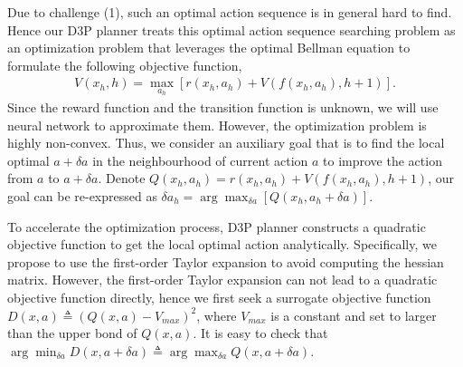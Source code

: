 \documentclass{article} %
\newcommand{\vmax}{V_{max}}
\newcommand{\lijun}[1]{ {#1}}
\newcommand{\yue}[1]{ {#1}}
\begin{document}
Due to challenge (1), such an optimal action sequence is in general hard to find. Hence our D3P planner treats this optimal action sequence searching problem as an optimization problem that leverages the optimal Bellman equation to formulate the following objective function,
\begin{align}
\label{eqn:obe}
    V(x_h, h) = \max_{a_h}[r(x_h, a_h) + V(f(x_h, a_h), h+1)].
\end{align}
Since the reward function and the transition function is unknown, we will use neural network to approximate them. However, the optimization problem is highly non-convex. Thus, we consider an auxiliary goal that is to find the local optimal $a + \delta a$ in the neighbourhood of current action $a$ to improve the action from $a$ to $a+\delta a$.
Denote $Q(x_h, a_h) =  r(x_h, a_h) + V(f(x_h, a_h), h+1)$, our goal can be re-expressed as $\lijun{\delta a_h} = \arg\max_{\delta a}\left[ Q(x_h, a_h+\delta a) \right]$.

To accelerate the optimization process, D3P planner constructs a quadratic objective function to get the local optimal action analytically. 
\yue{Specifically, we propose to use the first-order Taylor expansion to avoid computing the hessian matrix. However, the first-order Taylor expansion can not lead to a quadratic objective function directly, hence we first seek a surrogate objective function $D(x,a) \triangleq \left( Q(x,a) -  \vmax \right)^2$, where $\vmax$ is a constant and set to larger than the upper bond of $Q(x,a)$.  It is easy to check that $\arg\min_{\delta a} D(x,a+\delta a) \triangleq \arg\max_{\delta a} Q(x,a + \delta a)$. }
\end{document}
